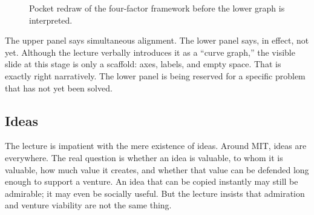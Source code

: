 \begin{figure}[H]
\centering
{}
\caption{Pocket redraw of the four-factor framework before the lower graph is interpreted.}
\end{figure}

The upper panel says simultaneous alignment. The lower panel says, in effect, not yet. Although the lecture verbally introduces it as a ``curve graph,'' the visible slide at this stage is only a scaffold: axes, labels, and empty space. That is exactly right narratively. The lower panel is being reserved for a specific problem that has not yet been solved.

\subsection{Ideas}

The lecture is impatient with the mere existence of ideas. Around MIT, ideas are everywhere. The real question is whether an idea is valuable, to whom it is valuable, how much value it creates, and whether that value can be defended long enough to support a venture. An idea that can be copied instantly may still be admirable; it may even be socially useful. But the lecture insists that admiration and venture viability are not the same thing.

